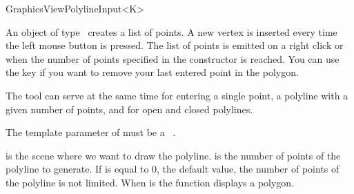 \begin{ccRefClass}[Qt::]{GraphicsViewPolylineInput<K>}

\ccDefinition
An object of type \ccRefName\ creates a list of points. A new 
vertex is inserted every time the left mouse button is pressed.
The list of points is emitted on a right click or when the number of
points specified in the constructor is reached. You can use the 
key if you want to remove your last entered point in the polygon.

The tool can serve at the same time for entering a single point,
a polyline with a given number of points, and for open and closed
polylines.


\ccParameters

The template parameter of  must be a \cgal\ . 

\ccInheritsFrom
{}

\ccGlue

\ccCreation
{}

{ is the scene where we want to draw the polyline.  is the
  number of points of the polyline to generate. If  is equal to 0,
  the default value, the number of points of the polyline is not
  limited. When  is  the function displays a
  polygon.}


\end{ccRefClass}







